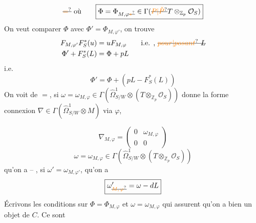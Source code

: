 \[
\deleted{\unsure{=}}\ \text{où}\qquad \boxed{\Phi=\Phi_{M,\varphi\deleted{\unsure{*}}}\in\Gamma(\deleted{\unsure{P|\check P}}T\otimes_{\mathbb Z_p}\mathcal O_S)}
\]
On veut comparer $\Phi$ avec $\Phi'=\Phi_{M,\varphi'}$, on trouve
\[
\begin{aligned}
F_{M,\varphi'}F_S^*(u)&=uF_{M,\varphi}\qquad\text{i.e. , }\deleted{\unsure{pour|posant}\ L}\\
\Phi'+F_S^*(L)&=\Phi+pL
\end{aligned}
\]
i.e.
\[
\boxed{\Phi'=\Phi+(pL-F_S^*(L))}
\]
On voit de $=$, si $\omega=\omega_{M,\varphi}\in\Gamma(\widehat\Omega^1_{S/W}\otimes(T\otimes_{\mathbb Z_p}\mathcal O_S))$ donne la forme connexion $\nabla\in\Gamma(\widehat\Omega^1_{S/W}\otimes M)$ via $\varphi$,

\[
\nabla_{M,\varphi}=\begin{pmatrix}0&\omega_{M,\varphi}\\0&0\end{pmatrix}
\]
\[
\boxed{\omega=\omega_{M,\varphi}\in\Gamma(\widehat\Omega^1_{S/W}\otimes(T\otimes_{\mathbb Z_p}\mathcal O_S))}
\]
qu'on a -- , si $\omega'=\omega_{M,\varphi'}$, qu'on a
\[
\boxed{\omega'_{\deleted{\unsure{M,\varphi}}}=\omega-dL}
\]
Écrivons les conditions  sur  $\Phi=\Phi_{M,\varphi}$ et $\omega=\omega_{M,\varphi}$ qui assurent qu'on a bien un objet de $C$. Ce sont

